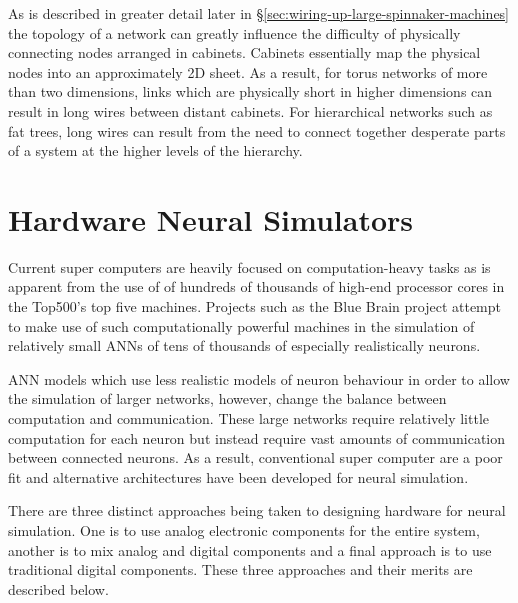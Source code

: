 			As is described in greater detail later in
			\S\ref{sec:wiring-up-large-spinnaker-machines} the topology of a network
			can greatly influence the difficulty of physically connecting nodes
			arranged in cabinets. Cabinets essentially map the physical nodes into an
			approximately 2D sheet. As a result, for torus networks of more than two
			dimensions, links which are physically short in higher dimensions can
			result in long wires between distant cabinets. For hierarchical networks
			such as fat trees, long wires can result from the need to connect together
			desperate parts of a system at the higher levels of the hierarchy.
			
			
	
	\section{Hardware Neural Simulators}
		
		
		Current super computers are heavily focused on computation-heavy tasks as is
		apparent from the use of of hundreds of thousands of high-end processor
		cores in the Top500's top five machines. Projects such as the Blue Brain
		project \cite{markram06} attempt to make use of such computationally
		powerful machines in the simulation of relatively small ANNs of tens of
		thousands of especially realistically neurons.
		
		ANN models which use less realistic models of neuron behaviour in order to
		allow the simulation of larger networks, however, change the balance between
		computation and communication. These large networks require relatively
		little computation for each neuron but instead require vast amounts of
		communication between connected neurons. As a result, conventional super
		computer are a poor fit and alternative architectures have been developed
		for neural simulation.
		
		There are three distinct approaches being taken to designing hardware for
		neural simulation. One is to use analog electronic components for the
		entire system, another is to mix analog and digital components and a final
		approach is to use traditional digital components. These three approaches
		and their merits are described below.
		
